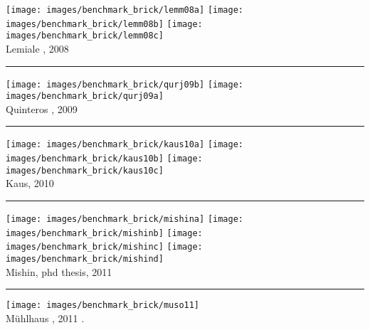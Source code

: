 \begin{center}
\texttt{[image: images/benchmark\_brick/lemm08a]}
\texttt{[image: images/benchmark\_brick/lemm08b]}
\texttt{[image: images/benchmark\_brick/lemm08c]}\\
{\captionfont Lemiale \etal, 2008 \cite{lemm08}}
\end{center}

\begin{center}\noindent\rule{12cm}{0.4pt}\end{center}

\begin{center}
\texttt{[image: images/benchmark\_brick/qurj09b]}
\texttt{[image: images/benchmark\_brick/qurj09a]}\\
{\captionfont Quinteros \etal, 2009 \cite{qurj09}}
\end{center}

\begin{center}\noindent\rule{12cm}{0.4pt}\end{center}

\begin{center}
\texttt{[image: images/benchmark\_brick/kaus10a]}
\texttt{[image: images/benchmark\_brick/kaus10b]}
\texttt{[image: images/benchmark\_brick/kaus10c]}\\
{\captionfont Kaus, 2010 \cite{kaus10}}
\end{center}

\begin{center}\noindent\rule{12cm}{0.4pt}\end{center}

\begin{center}
\texttt{[image: images/benchmark\_brick/mishina]}
\texttt{[image: images/benchmark\_brick/mishinb]}
\texttt{[image: images/benchmark\_brick/mishinc]}
\texttt{[image: images/benchmark\_brick/mishind]}\\
{\captionfont Mishin, phd thesis, 2011 \cite{mishin11}}
\end{center}

\begin{center}\noindent\rule{12cm}{0.4pt}\end{center}

\begin{center}
\texttt{[image: images/benchmark\_brick/muso11]}\\
{\captionfont M{\"u}hlhaus \etal, 2011 \cite{muso11}.}
\end{center}

